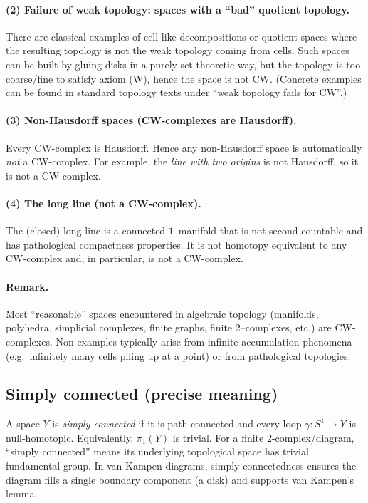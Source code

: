 \documentclass[11pt]{article}
\theoremstyle{definition}
\theoremstyle{plain}
\theoremstyle{remark}
\begin{document}
\paragraph{(2) Failure of weak topology: spaces with a ``bad'' quotient topology.}
There are classical examples of cell-like decompositions or quotient spaces where the resulting topology is not the weak topology
coming from cells. Such spaces can be built by gluing disks in a purely set-theoretic way, but the topology is too coarse/fine
to satisfy axiom (W), hence the space is not CW.
(Concrete examples can be found in standard topology texts under ``weak topology fails for CW''.)

\paragraph{(3) Non-Hausdorff spaces (CW-complexes are Hausdorff).}
Every CW-complex is Hausdorff.
Hence any non-Hausdorff space is automatically \emph{not} a CW-complex.
For example, the \emph{line with two origins} is not Hausdorff, so it is not a CW-complex.

\paragraph{(4) The long line (not a CW-complex).}
The (closed) long line is a connected $1$--manifold that is not second countable and has pathological compactness properties.
It is not homotopy equivalent to any CW-complex and, in particular, is not a CW-complex.

\paragraph{Remark.}
Most ``reasonable'' spaces encountered in algebraic topology (manifolds, polyhedra, simplicial complexes, finite graphs,
finite 2--complexes, etc.) are CW-complexes. Non-examples typically arise from infinite accumulation phenomena
(e.g.\ infinitely many cells piling up at a point) or from pathological topologies.

\subsection{Simply connected (precise meaning)}
A space $Y$ is \emph{simply connected} if it is path-connected and every loop $\gamma:S^1\to Y$ is null-homotopic.
Equivalently, $\pi_1(Y)$ is trivial.
For a finite 2-complex/diagram, ``simply connected'' means its underlying topological space has trivial fundamental group.
In van Kampen diagrams, simply connectedness ensures the diagram fills a single boundary component (a disk) and supports van Kampen's lemma.\cite{hatcher2002,vanKampen1933}
\end{document}

